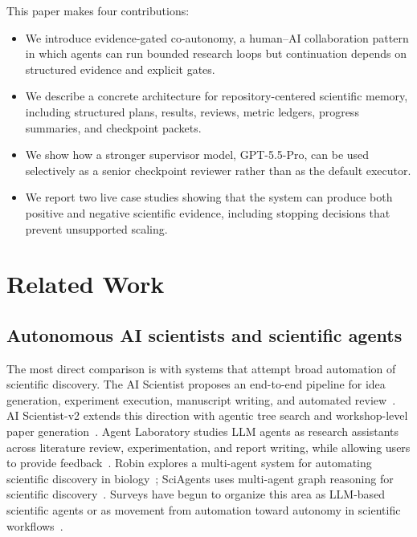\documentclass{article}
\newcommand{\gptpro}{GPT-5.5-Pro}
\begin{document}
This paper makes four contributions:
\begin{itemize}[leftmargin=*, itemsep=0.15em, topsep=0.25em]
    \item We introduce evidence-gated co-autonomy, a human--AI collaboration pattern in which agents can run bounded research loops but continuation depends on structured evidence and explicit gates.
    \item We describe a concrete architecture for repository-centered scientific memory, including structured plans, results, reviews, metric ledgers, progress summaries, and checkpoint packets.
    \item We show how a stronger supervisor model, \gptpro, can be used selectively as a senior checkpoint reviewer rather than as the default executor.
    \item We report two live case studies showing that the system can produce both positive and negative scientific evidence, including stopping decisions that prevent unsupported scaling.
\end{itemize}

\section{Related Work}

\subsection{Autonomous AI scientists and scientific agents}

The most direct comparison is with systems that attempt broad automation of scientific discovery. The AI Scientist proposes an end-to-end pipeline for idea generation, experiment execution, manuscript writing, and automated review~\citep{lu2024aiscientist}. AI Scientist-v2 extends this direction with agentic tree search and workshop-level paper generation~\citep{yamada2025aiscientistv2}. Agent Laboratory studies LLM agents as research assistants across literature review, experimentation, and report writing, while allowing users to provide feedback~\citep{schmidgall2025agentlab}. Robin explores a multi-agent system for automating scientific discovery in biology~\citep{ghareeb2025robin}; SciAgents uses multi-agent graph reasoning for scientific discovery~\citep{ghafarollahi2024sciagents}. Surveys have begun to organize this area as LLM-based scientific agents or as movement from automation toward autonomy in scientific workflows~\citep{ren2025scientificagents,zheng2025automationautonomy,zhang2025scientificmethod}.
\end{document}

